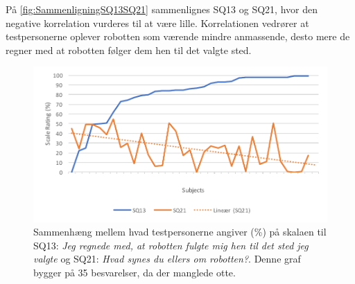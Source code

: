 \noindent
%
På \autoref{fig:SammenligningSQ13SQ21} sammenlignes SQ13 og SQ21, hvor den negative korrelation vurderes til at være lille. Korrelationen vedrører at testpersonerne oplever robotten som værende mindre anmassende, desto mere de regner med at robotten følger dem hen til det valgte sted.
%
\begin{figure}[H]
	\centering
	\includegraphics[width=\textwidth]{Figure/Korrelationsgrafer/SQ13+SQ21}
	\caption{Sammenhæng mellem hvad testpersonerne angiver (\%) på skalaen til SQ13: \textit{Jeg regnede med, at robotten fulgte mig hen til det sted jeg valgte} og SQ21: \textit{Hvad synes du ellers om robotten?}. Denne graf bygger på 35 besvarelser, da der manglede otte.}
	\label{fig:SammenligningSQ13SQ21}
\end{figure}
\noindent
%
